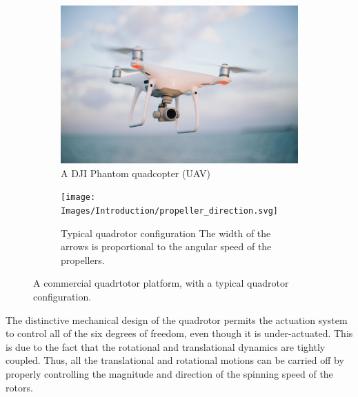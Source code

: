 \documentclass{thesisreport}
\begin{document}
\begin{figure}[h]
     \centering
     \begin{subfigure}[b]{0.45\textwidth}
         \centering
         \includegraphics[width=\textwidth]{Images/Introduction/drone}
         \caption[Caption for LOF]{A DJI Phantom quadcopter (UAV)\protect\footnotemark}
         \label{fig:drone}
     \end{subfigure}
     \hfill
     \begin{subfigure}[b]{0.45\textwidth}
         \centering
         \texttt{[image: Images/Introduction/propeller\_direction.svg]}
         \caption{Typical quadrotor configuration The width of the arrows is proportional to the angular speed of the propellers.\cite{Bouabdalla2007}}
         \label{fig:propeller_directions}
     \end{subfigure}
        \caption{A commercial quadrtotor platform, with a typical quadrotor configuration.}
        \label{fig:three graphs}
\end{figure}

\noindent The distinctive mechanical design of the quadrotor permits the actuation system to control all of the six degrees of freedom, even though it is under-actuated. This is due to the fact that the rotational and translational dynamics are tightly coupled. Thus, all the translational and rotational motions can be carried off by properly controlling the magnitude and direction of the spinning speed of the rotors.   

\noindent {}


\pagebreak
\end{document}
